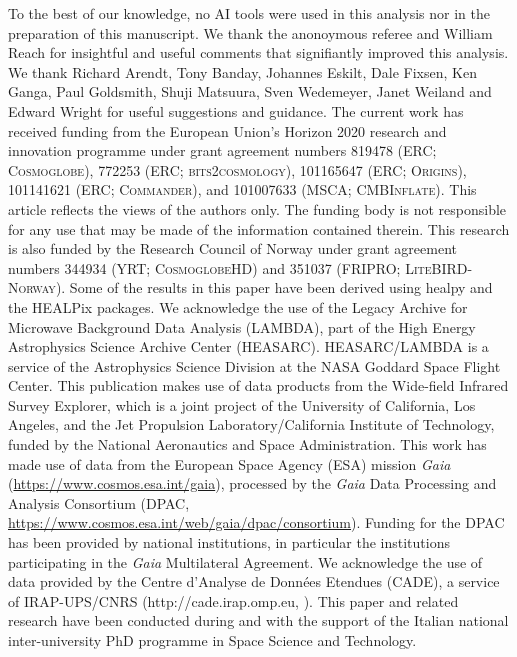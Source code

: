 \documentclass[twocolumn]{aa}
\begin{document}
\begin{acknowledgements}
  To the best of our knowledge, no AI tools were used in this analysis nor in the preparation of this manuscript.
  We thank the anonoymous referee and William Reach for insightful and useful comments that signifiantly improved this analysis.
  We thank Richard Arendt, Tony Banday, Johannes Eskilt, Dale Fixsen,
  Ken Ganga, Paul Goldsmith, Shuji Matsuura, Sven Wedemeyer, Janet
  Weiland and Edward Wright for useful suggestions and guidance.
  The current work has received funding from the
  European Union’s Horizon 2020 research and innovation programme
  under grant agreement numbers 819478 (ERC; \textsc{Cosmoglobe}),
  772253 (ERC; \textsc{bits2cosmology}), 101165647 (ERC;
  \textsc{Origins}), 101141621 (ERC; \textsc{Commander}), and 101007633 (MSCA;
  \textsc{CMBInflate}). This article reflects the views of the authors only. The funding
  body is not responsible for any use that may be made of the
  information contained therein. This research is
  also funded by the Research Council of Norway under grant agreement
  numbers 344934 (YRT; \textsc{CosmoglobeHD}) and 351037 (FRIPRO;
  \textsc{LiteBIRD-Norway}). Some of the results in this paper have been
  derived using healpy \citep{Zonca2019} and the HEALPix
  \citep{healpix} packages.  We acknowledge the use of the Legacy
  Archive for Microwave Background Data Analysis (LAMBDA), part of the
  High Energy Astrophysics Science Archive Center
  (HEASARC). HEASARC/LAMBDA is a service of the Astrophysics Science
  Division at the NASA Goddard Space Flight Center. This publication
  makes use of data products from the Wide-field Infrared Survey
  Explorer, which is a joint project of the University of California,
  Los Angeles, and the Jet Propulsion Laboratory/California Institute
  of Technology, funded by the National Aeronautics and Space
  Administration. This work has made use of data from the European
  Space Agency (ESA) mission {\it Gaia}
  (\url{https://www.cosmos.esa.int/gaia}), processed by the {\it Gaia}
  Data Processing and Analysis Consortium (DPAC,
  \url{https://www.cosmos.esa.int/web/gaia/dpac/consortium}). Funding
  for the DPAC has been provided by national institutions, in
  particular the institutions participating in the {\it Gaia}
  Multilateral Agreement.
  We acknowledge the use of data provided by the Centre d'Analyse de 
  Données Etendues (CADE), a service of IRAP-UPS/CNRS (http://cade.irap.omp.eu, \citealt{paradis:2012}). 
  This paper and related research have been conducted during and with the support 
  of the Italian national inter-university PhD programme in Space Science and Technology. 

\end{acknowledgements}
\end{document}
